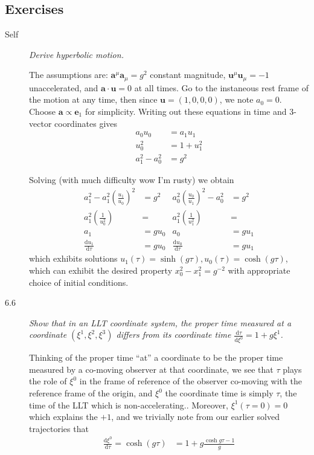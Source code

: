 \documentclass[12pt]{report}
\newcommand{\rd}[2]{\frac{\mathrm{d}#1}{\mathrm{d}#2}}
\newcommand{\bm}[1]{\boldsymbol{\mathbf{#1}}}
\begin{document}
\subsection{Exercises}

\begin{description}
    \item[Self] \emph{Derive hyperbolic motion.}

        The assumptions are: $\bm{a}^\mu\bm{a}_\mu = g^2$ constant
        magnitude, $\bm{u}^\mu\bm{u}_\mu = -1$ unaccelerated, and
        $\bm{a} \cdot \bm{u} = 0$ at all times. Go to the instaneous
        rest frame of the motion at any time, then since $\bm{u} = (1, 0, 0,
        0)$, we note $a_0 = 0$. Choose $\bm{a} \propto \bm{e}_1$ for
        simplicity. Writing out these equations in time and 3-vector coordinates
        gives
        \begin{align*}
            a_0u_0 &= a_1u_1\\
            u_0^2 &= 1 + u_1^2\\
            a_1^2 - a_0^2 &= g^2
        \end{align*}

        Solving (with much difficulty wow I'm rusty) we obtain
        \begin{align*}
            a_1^2 - a_1^2\left( \frac{u_1}{u_0} \right)^2 &= g^2 &
            a_0^2\left( \frac{u_0}{u_1} \right)^2 - a_0^2 &= g^2\\
            a_1^2\left( \frac{1}{u_0^2} \right) &=&
            a_1^2\left( \frac{1}{u_1^2} \right) &=\\
            a_1 &= gu_0&
            a_0 &= gu_1\\
            \rd{u_1}{\tau} &= gu_0 &
            \rd{u_0}{\tau} &= gu_1
        \end{align*}
        which exhibits solutions $u_1(\tau) = \sinh(g\tau), u_0(\tau) =
        \cosh(g\tau)$, which can  exhibit the desired property $x_0^2 - x_1^2 =
        g^{-2}$ with appropriate choice of initial conditions.

    \item[6.6] \emph{Show that in an LLT coordinate system, the proper time
        measured at a coordinate $(\xi^1, \xi^2, \xi^3)$ differs from its
        coordinate time $\rd{\tau}{\xi^0} = 1 + g\xi^1$.}

        Thinking of the proper time ``at'' a coordinate to be the proper time
        measured by a co-moving observer at that coordinate, we see that $\tau$
        plays the role of $\xi^0$ in the frame of reference of the observer
        co-moving with the reference frame of the origin, and $\xi^0$ the
        coordinate time is simply $\tau$, the time of the LLT which is
        non-accelerating.. Moreover, $\xi^1(\tau=0) = 0$ which explains the
        $+1$, and we trivially note from our earlier solved trajectories that
        \begin{align*}
            \rd{\xi^0}{\tau} = \cosh(g\tau) &= 1 + g\frac{\cosh g\tau - 1}{g}
        \end{align*}


\end{description}
\end{document}
